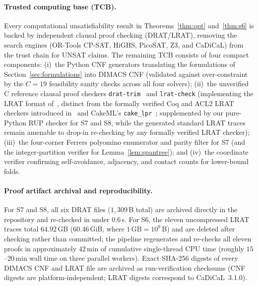 \documentclass[11pt]{article}
\begin{document}
\paragraph{Trusted computing base (TCB).}
Every computational unsatisfiability result in Theorems~\ref{thm:opt} and~\ref{thm:s6} is backed by independent clausal proof checking (DRAT/LRAT), removing the search engines (OR-Tools CP-SAT, HiGHS, PicoSAT, Z3, and CaDiCaL) from the trust chain for UNSAT claims. The remaining TCB consists of four compact components: (i)~the Python CNF generators translating the formulations of Section~\ref{sec:formulations} into DIMACS CNF (validated against over-constraint by the $C = 19$ feasibility sanity checks across all four solvers); (ii)~the unverified C reference clausal proof checkers \texttt{drat-trim}~\cite{wetzler2014} and \texttt{lrat-check} (implementing the LRAT format of~\cite{cruzfilipe2017}, distinct from the formally verified Coq and ACL2 LRAT checkers introduced in~\cite{cruzfilipe2017} and CakeML's \texttt{cake\_lpr}~\cite{tan2021}; supplemented by our pure-Python RUP checker for S7 and S8, while the generated standard LRAT traces remain amenable to drop-in re-checking by any formally verified LRAT checker); (iii)~the four-corner Ferrers polyomino enumerator and parity filter for S7 (and the integer-partition verifier for Lemma~\ref{lem:spantree}); and (iv)~the coordinate verifier confirming self-avoidance, adjacency, and contact counts for lower-bound folds.

\paragraph{Proof artifact archival and reproducibility.}
For S7 and S8, all six DRAT files ($1{,}309\,$B total) are archived directly in the repository and re-checked in under $0.6\,$s. For S6, the eleven uncompressed LRAT traces total $64.92\,$GB ($60.46\,$GiB, where $1\,\mathrm{GB} = 10^9\,$B) and are deleted after checking rather than committed; the pipeline regenerates and re-checks all eleven proofs in approximately $42\,$min of cumulative single-thread CPU time (roughly $15$--$20\,$min wall time on three parallel workers). Exact SHA-256 digests of every DIMACS CNF and LRAT file are archived as run-verification checksums (CNF digests are platform-independent; LRAT digests correspond to CaDiCaL~3.1.0).
\end{document}
